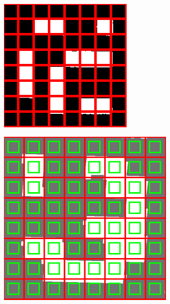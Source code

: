 \documentclass[../Head/report.tex]{subfiles}
\begin{document}
\begin{figure}[H]
\begin{subfigure}[b]{.15\textwidth}
        \caption{}
        \label{fig:aruco_detection2}
    \end{subfigure}
        \begin{subfigure}[b]{.15\textwidth}
        \centering
        \includegraphics[width=1\linewidth]{../Figures/aruco_detection3.png}
        \caption{}
        \label{fig:aruco_detection3}
    \end{subfigure}
        \begin{subfigure}[b]{.15\textwidth}
        \centering
        \includegraphics[width=1\linewidth]{../Figures/aruco_detection4.png}

\end{subfigure}
\end{figure}
\end{document}
